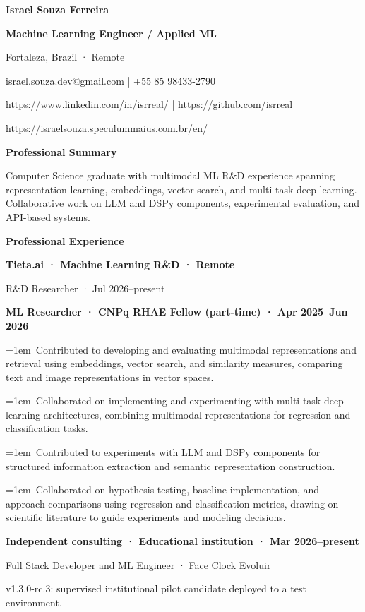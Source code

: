 \documentclass[a4paper,10pt]{article}
\begin{document}
\textbf{Israel Souza Ferreira}\par
\textbf{Machine Learning Engineer / Applied ML}\par
Fortaleza, Brazil · Remote\par
israel.souza.dev@gmail.com | +55 85 98433-2790\par
https://www.linkedin.com/in/isrreal/ | https://github.com/isrreal\par
https://israelsouza.speculummaius.com.br/en/\par
\vspace{5pt}\textbf{Professional Summary}\par
Computer Science graduate with multimodal ML R\&D experience spanning representation learning, embeddings, vector search, and multi-task deep learning. Collaborative work on LLM and DSPy components, experimental evaluation, and API-based systems.\par
\vspace{5pt}\textbf{Professional Experience}\par
\textbf{Tieta.ai · Machine Learning R\&D · Remote}\par
R\&D Researcher · Jul 2026–present\par
\textbf{ML Researcher · CNPq RHAE Fellow (part-time) · Apr 2025–Jun 2026}\par
\hangindent=1em\textbullet\ Contributed to developing and evaluating multimodal representations and retrieval using embeddings, vector search, and similarity measures, comparing text and image representations in vector spaces.\par
\hangindent=1em\textbullet\ Collaborated on implementing and experimenting with multi-task deep learning architectures, combining multimodal representations for regression and classification tasks.\par
\hangindent=1em\textbullet\ Contributed to experiments with LLM and DSPy components for structured information extraction and semantic representation construction.\par
\hangindent=1em\textbullet\ Collaborated on hypothesis testing, baseline implementation, and approach comparisons using regression and classification metrics, drawing on scientific literature to guide experiments and modeling decisions.\par
\textbf{Independent consulting · Educational institution · Mar 2026–present}\par
Full Stack Developer and ML Engineer · Face Clock Evoluir\par
v1.3.0-rc.3: supervised institutional pilot candidate deployed to a test environment.\par
\end{document}

